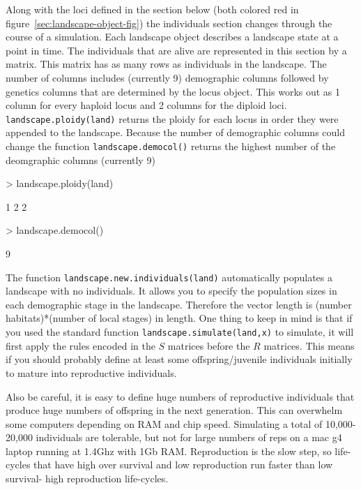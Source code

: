 \documentclass[10pt]{article}
\newcommand{\code}[1]{\texttt{#1}}
\begin{document}
Along with the loci defined in the section below (both colored red in
figure~\ref{sec:landscape-object-fig}) the individuals section changes
through the course of a simulation.  Each landscape object describes a
landscape state at a point in time.  The individuals that are alive
are represented in this section by a matrix.  This matrix has as many
rows as individuals in the landscape.  The number of columns includes
(currently 9) demographic columns followed by genetics columns that
are determined by the locus object.  This works out as 1 column for
every haploid locus and 2 columns for the diploid
loci. \code{landscape.ploidy(land)} returns the ploidy for each locus
in order they were appended to the landscape.  Because the number of demographic columns could change the function \code{landscape.democol()} returns the highest number of the deomgraphic columns (currently 9)
\begin{Schunk}
\begin{Sinput}
> landscape.ploidy(land)
\end{Sinput}
\begin{Soutput}
[1] 1 2 2
\end{Soutput}
\begin{Sinput}
> landscape.democol()
\end{Sinput}
\begin{Soutput}
[1] 9
\end{Soutput}
\end{Schunk}

The function \code{landscape.new.individuals(land)} automatically
populates a landscape with no individuals.  It allows you to specify
the population sizes in each demographic stage in the landscape.
Therefore the vector length is (number habitats)*(number of local
stages) in length.  One thing to keep in mind is that if you used the
standard function \code{landscape.simulate(land,x)} to simulate, it
will first apply the rules encoded in the $S$ matrices before the $R$
matrices.  This means if you should probably define at least some
offspring/juvenile individuals initially to mature into reproductive individuals.

Also be careful, it is easy to define huge numbers of reproductive
individuals that produce huge numbers of offspring in the next
generation.  This can overwhelm some computers depending on RAM and
chip speed.  Simulating a total of 10,000-20,000 individuals are
tolerable, but not for large numbers of reps on a mac g4 laptop
running at 1.4Ghz with 1Gb RAM.  Reproduction is the slow step, so
life-cycles that have high over survival and low reproduction run
faster than low survival- high reproduction life-cycles.
\end{document}
